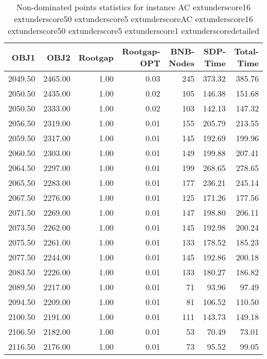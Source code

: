 \begin{table}
\caption{Non-dominated points statistics for instance AC	extunderscore16	extunderscore50	extunderscore5	extunderscoreAC	extunderscore16	extunderscore50	extunderscore5	extunderscore1	extunderscoredetailed}
\label{tab:stats/AC_16_50_5_AC_16_50_5_1_detailed}
\begin{tabular}{rrrrrrr}
\toprule
OBJ1 & OBJ2 & Rootgap & Rootgap-OPT & BNB-Nodes & SDP-Time & Total-Time \\
\midrule
2049.50 & 2465.00 & 1.00 & 0.03 & 245 & 373.32 & 385.76 \\
2050.50 & 2435.00 & 1.00 & 0.02 & 105 & 146.38 & 151.68 \\
2050.50 & 2333.00 & 1.00 & 0.02 & 103 & 142.13 & 147.32 \\
2056.50 & 2319.00 & 1.00 & 0.01 & 155 & 205.79 & 213.55 \\
2059.50 & 2317.00 & 1.00 & 0.01 & 145 & 192.69 & 199.96 \\
2060.50 & 2303.00 & 1.00 & 0.01 & 149 & 199.88 & 207.41 \\
2064.50 & 2297.00 & 1.00 & 0.01 & 199 & 268.65 & 278.65 \\
2065.50 & 2283.00 & 1.00 & 0.01 & 177 & 236.21 & 245.14 \\
2067.50 & 2276.00 & 1.00 & 0.01 & 125 & 171.26 & 177.56 \\
2071.50 & 2269.00 & 1.00 & 0.01 & 147 & 198.80 & 206.11 \\
2073.50 & 2262.00 & 1.00 & 0.01 & 145 & 192.98 & 200.24 \\
2075.50 & 2261.00 & 1.00 & 0.01 & 133 & 178.52 & 185.23 \\
2077.50 & 2244.00 & 1.00 & 0.01 & 145 & 192.86 & 200.18 \\
2083.50 & 2226.00 & 1.00 & 0.01 & 133 & 180.27 & 186.82 \\
2089.50 & 2217.00 & 1.00 & 0.01 & 71 & 93.96 & 97.49 \\
2094.50 & 2209.00 & 1.00 & 0.01 & 81 & 106.52 & 110.50 \\
2100.50 & 2191.00 & 1.00 & 0.01 & 111 & 143.73 & 149.18 \\
2106.50 & 2182.00 & 1.00 & 0.01 & 53 & 70.49 & 73.01 \\
2116.50 & 2176.00 & 1.00 & 0.01 & 73 & 95.52 & 99.05 \\
\bottomrule
\end{tabular}
\end{table}
